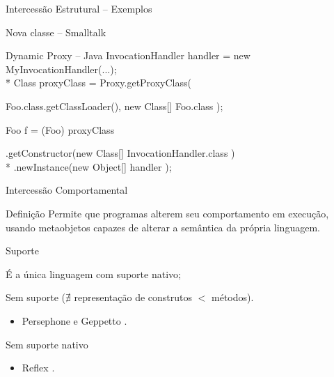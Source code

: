 \documentclass[12pt,t]{beamer}
\begin{document}
 	 \begin{frame}{Intercessão Estrutural -- Exemplos}
 	 	\begin{exampleblock}{Nova classe -- Smalltalk}
 	 		
 	 	\end{exampleblock}
 	 	\pause
 	 	\begin{exampleblock}{Dynamic Proxy -- Java}
 	 		InvocationHandler handler = new MyInvocationHandler(...);\\*
		    Class proxyClass = Proxy.getProxyClass(
	    	\begin{adjustwidth}{2.5em}{0pt}
		        Foo.class.getClassLoader(), new Class[] { Foo.class });
	        \end{adjustwidth}
		    Foo f = (Foo) proxyClass
		    \begin{adjustwidth}{2.5em}{0pt}
		        .getConstructor(new Class[] { InvocationHandler.class }) \\*
		        .newInstance(new Object[] { handler });
	        \end{adjustwidth}
 	 	\end{exampleblock}
 	 \end{frame}
 	 \begin{frame}{Intercessão Comportamental}
 	 	\begin{block}{Definição  \cite{mostinckx2007mirages}}
 	 		Permite que programas alterem seu comportamento em execução, usando metaobjetos capazes de alterar a semântica da própria linguagem.
 	 	\end{block} 
 	 	\pause		 	 	 	
 		\begin{block}{Suporte}
 			\begin{description}  [Smalltalk:] 
	 			\item [CLOS] É a única linguagem com suporte nativo;
	 			\pause
	 			\item [Smalltalk:] Sem suporte ($\nexists$ representação de construtos $<$ métodos). 
	 			\begin{itemize}
	 				\item Persephone e Geppetto \cite{marschall2006taking,rothlisberger2006geppetto}.
	 			\end{itemize}
	 			\pause
	 			\item [Java:] Sem suporte nativo
	 			\begin{itemize}
	 				\item Reflex \cite{tanter2001reflex}.
	 			\end{itemize}
	 		\end{description}
 	 	\end{block} 	 	 	 	
 	 \end{frame}
\end{document}
